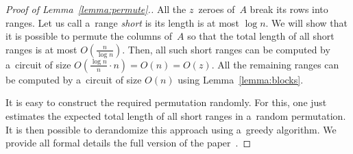 \documentclass[a4paper,UKenglish,cleveref, autoref]{lipics-v2019}
\begin{document}
\begin{proof}[Proof of Lemma~\ref{lemma:permute}.]
All the $z$~zeroes of~$A$ break its rows into ranges.
Let us call a~range {\em short} is its length is at most $\log n$.
We will show that it is possible to permute the columns of~$A$
so that the total length of all short ranges is at most $O(\frac{n}{\log n})$. Then, all such short ranges can be computed by a~circuit of size $O(\frac{\log n}{n} \cdot n)=O(n)=O(z)$.
All the remaining ranges can be computed by a~circuit of size $O(n)$ using Lemma~\ref{lemma:blocks}.

It is easy to construct the required permutation randomly. For this, one just 
estimates the expected total length of all short ranges in a~random permutation. It is then possible to derandomize this approach using a~greedy algorithm. We provide all formal details %
the full version of the paper~\cite{DBLP:journals/eccc/KulikovMMP19}.

%
%


\end{proof}
\end{document}
